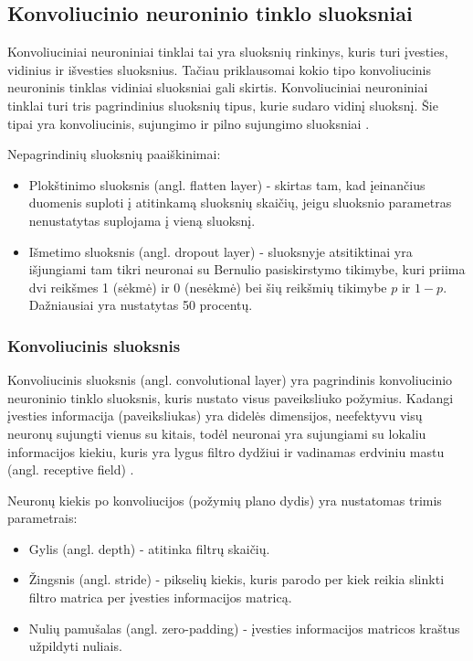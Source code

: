 \documentclass{VUMIFPSbakalaurinis}
\begin{document}
\subsection{Konvoliucinio neuroninio tinklo sluoksniai}
Konvoliuciniai neuroniniai tinklai tai yra sluoksnių rinkinys, kuris turi įvesties, vidinius ir išvesties sluoksnius. Tačiau priklausomai 
kokio tipo konvoliucinis neuroninis tinklas vidiniai sluoksniai gali skirtis. Konvoliuciniai neuroniniai tinklai turi tris pagrindinius 
sluoksnių tipus, kurie sudaro vidinį sluoksnį. Šie tipai yra konvoliucinis, sujungimo ir pilno sujungimo sluoksniai \cite{CNNbasic}.

Nepagrindinių sluoksnių paaiškinimai:
\begin{itemize}
\item Plokštinimo sluoksnis (angl. flatten layer) - skirtas tam, kad įeinančius duomenis suploti į atitinkamą sluoksnių skaičių, jeigu sluoksnio parametras nenustatytas suplojama į vieną sluoksnį.
\item Išmetimo sluoksnis (angl. dropout layer) - sluoksnyje atsitiktinai yra išjungiami tam tikri neuronai su Bernulio pasiskirstymo tikimybe, kuri priima dvi reikšmes 1 (sėkmė) ir 0 (nesėkmė) 
bei šių reikšmių tikimybe \(p\) ir \(1 - p\). Dažniausiai yra nustatytas 50 procentų.
\end{itemize}

\subsubsection{Konvoliucinis sluoksnis}
Konvoliucinis sluoksnis (angl. convolutional layer) yra pagrindinis konvoliucinio neuroninio tinklo sluoksnis, kuris nustato visus paveiksliuko požymius.
Kadangi įvesties informacija (paveiksliukas) yra didelės dimensijos, neefektyvu visų neuronų sujungti vienus su kitais, todėl neuronai yra sujungiami
su lokaliu informacijos kiekiu, kuris yra lygus filtro dydžiui ir vadinamas erdviniu mastu (angl. receptive field) \cite{layers-CS231n}.

Neuronų kiekis po konvoliucijos (požymių plano dydis) yra nustatomas trimis parametrais:
\begin{itemize}
\item Gylis (angl. depth) - atitinka filtrų skaičių.
\item Žingsnis (angl. stride) - pikselių kiekis, kuris parodo per kiek reikia slinkti filtro matrica per įvesties informacijos matricą.
\item Nulių pamušalas (angl. zero-padding) - įvesties informacijos matricos kraštus užpildyti nuliais.
\end{itemize}
\end{document}
